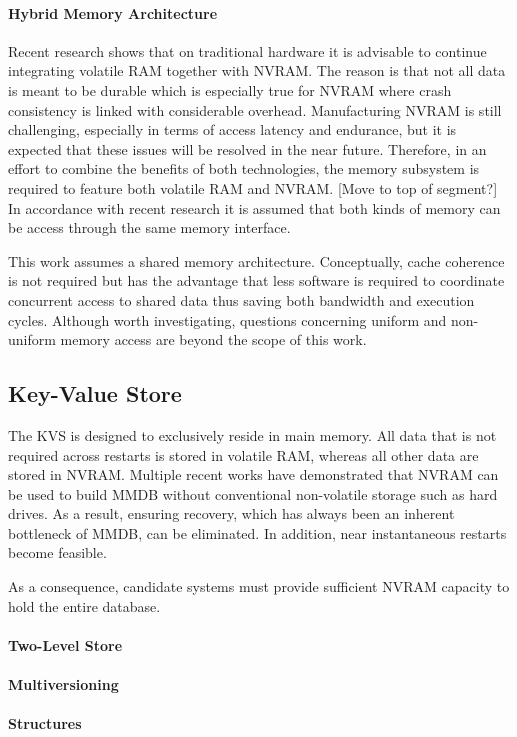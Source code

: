 \paragraph{Hybrid Memory Architecture}

Recent research shows that on traditional hardware it is advisable to continue
integrating volatile RAM together with NVRAM. The reason is that not all data is
meant to be durable which is especially true for NVRAM where crash consistency
is linked with considerable overhead. Manufacturing NVRAM is still challenging,
especially in terms of access latency and endurance, but it is expected that
these issues will be resolved in the near future. Therefore, in an effort to
combine the benefits of both technologies, the memory subsystem is required to
feature both volatile RAM and NVRAM. [Move to top of segment?] In accordance
with recent research it is assumed that both kinds of memory can be access
through the same memory interface.

This work assumes a shared memory architecture. Conceptually, cache coherence is
not required but has the advantage that less software is required to coordinate
concurrent access to shared data thus saving both bandwidth and execution
cycles. Although worth investigating, questions concerning uniform and
non-uniform memory access are beyond the scope of this work.

\subsection{Key-Value Store}

The KVS is designed to exclusively reside in main memory. All data that is not
required across restarts is stored in volatile RAM, whereas all other data are
stored in NVRAM. Multiple recent works have demonstrated that NVRAM can be used
to build MMDB without conventional non-volatile storage such as hard drives. As
a result, ensuring recovery, which has always been an inherent bottleneck of
MMDB, can be eliminated. In addition, near instantaneous restarts become
feasible.

As a consequence, candidate systems must provide sufficient NVRAM capacity to
hold the entire database.

\paragraph{Two-Level Store}

\paragraph{Multiversioning}

\paragraph{Structures}
